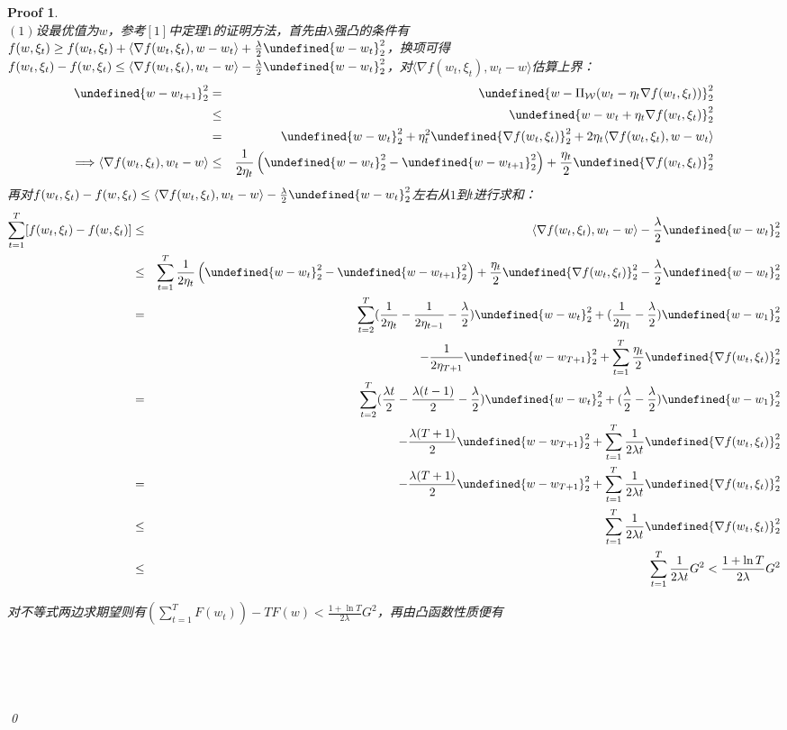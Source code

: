 \documentclass[a4paper,UTF8]{article}
\let\norm\undefined %
\DeclarePairedDelimiter\norm{\lVert}{\rVert}
\numberwithin{equation}{section}
\newtheorem*{myProof}{Proof}
\begin{document}
\begin{myProof}~\\
$(1)$设最优值为$w$，参考$[1]$中定理$1$的证明方法，首先由$\lambda$强凸的条件有$f(w, \xi_t) \ge f(w_t, \xi_t) + \langle \nabla f(w_t, \xi_t), w - w_t \rangle + \frac{\lambda}{2}\norm{w - w_t}_2^2$，换项可得$f(w_t, \xi_t) - f(w, \xi_t) \le \langle \nabla f(w_t, \xi_t), w_t - w \rangle - \frac{\lambda}{2}\norm{w - w_t}_2^2$，对$\langle \nabla f(w_t, \xi_t), w_t - w  \rangle$估算上界：
\begin{eqnarray*}
\norm{w - w_{t+1}}_2^2 &=& \norm{w - \Pi_\mathcal{W}(w_t - \eta_t \nabla f(w_t, \xi_t))}_2^2 \\
&\le& \norm{w - w_t + \eta_t\nabla f(w_t, \xi_t)}_2^2 \\
&=& \norm{w - w_t}_2^2 + \eta_t^2\norm{\nabla f(w_t, \xi_t)}_2^2 + 2 \eta_t \langle \nabla f(w_t, \xi_t), w - w_t  \rangle \\
\Longrightarrow \langle \nabla f(w_t, \xi_t), w_t - w  \rangle &\le& \frac{1}{2\eta_t} \left( \norm{w - w_t}_2^2  - \norm{w - w_{t+1}}_2^2 \right) + \frac{\eta_t}{2}\norm{\nabla f(w_t, \xi_t)}_2^2
\end{eqnarray*}
再对$f(w_t, \xi_t) - f(w, \xi_t) \le \langle \nabla f(w_t, \xi_t), w_t - w \rangle - \frac{\lambda}{2}\norm{w - w_t}_2^2$左右从$1$到$t$进行求和：
\begin{eqnarray*}
\sum_{t=1}^T [f(w_t, \xi_t) - f(w, \xi_t)] &\le& \langle \nabla f(w_t, \xi_t), w_t - w \rangle - \frac{\lambda}{2}\norm{w - w_t}_2^2 \\
&\le& \sum_{t=1}^T \frac{1}{2\eta_t} \left( \norm{w - w_t}_2^2  - \norm{w - w_{t+1}}_2^2 \right) + \frac{\eta_t}{2}\norm{\nabla f(w_t, \xi_t)}_2^2 - \frac{\lambda}{2}\norm{w - w_t}_2^2 \\
&=& \sum_{t=2}^T (\frac{1}{2\eta_t} - \frac{1}{2\eta_{t-1}} - \frac{\lambda}{2}) \norm{w - w_t}_2^2 + (\frac{1}{2\eta_1} - \frac{\lambda}{2}) \norm{w - w_1}_2^2 \\
&& - \frac{1}{2\eta_{T+1}}\norm{w - w_{T+1}}_2^2 + \sum_{t=1}^T \frac{\eta_t}{2} \norm{\nabla f(w_t, \xi_t)}_2^2 \\
&=& \sum_{t=2}^T (\frac{\lambda t}{2} - \frac{\lambda(t-1)}{2} - \frac{\lambda}{2}) \norm{w - w_t}_2^2 + (\frac{\lambda}{2} - \frac{\lambda}{2}) \norm{w - w_1}_2^2 \\
&& - \frac{\lambda (T+1)}{2}\norm{w - w_{T+1}}_2^2 + \sum_{t=1}^T \frac{1}{2\lambda t} \norm{\nabla f(w_t, \xi_t)}_2^2 \\
&=& - \frac{\lambda (T+1)}{2}\norm{w - w_{T+1}}_2^2 + \sum_{t=1}^T \frac{1}{2\lambda t} \norm{\nabla f(w_t, \xi_t)}_2^2 \\
&\le& \sum_{t=1}^T \frac{1}{2\lambda t} \norm{\nabla f(w_t, \xi_t)}_2^2 \\
&\le& \sum_{t=1}^T \frac{1}{2\lambda t} G^2 < \frac{1 + \ln T}{2\lambda} G^2
\end{eqnarray*}

对不等式两边求期望则有$\left(\sum_{t=1}^T F(w_t)\right) - T F(w) < \frac{1 + \ln T}{2\lambda}G^2$，再由凸函数性质便有$$

	~\\
	~\\
	~\\
	~\\	
	\qed
\end{myProof}
\newpage
\end{document}
